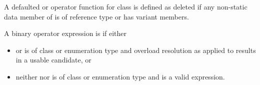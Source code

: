 \pnum
A defaulted \tcode{<=>} or \tcode{==} operator function for class 
%
%
is defined as deleted if
any non-static data member of  is of reference type or
 has variant members.

\pnum
A binary operator expression  is
if either

\begin{itemize}
\item
{} or  is of class or enumeration type and
overload resolution as applied to 
results in a usable candidate, or

\item
neither  nor  is of class or enumeration type and
 is a valid expression.
\end{itemize}

